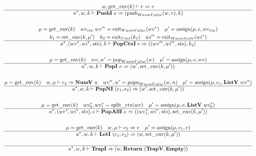 \begin{gather*}
  w, \getenv(k) \vdash e \Rightarrow v \\
  \hline
  \seq{a}, w, k \vdash \pushi ~ e \Rightarrow (\push_{WasmValue}(w, v), k) \\
%
\newline \\
  \mu = \getenv(k) \quad
  wv_{ctx} ~ \seq{wv'} = \exit_{WasmValue}(\seq{wv}) \quad
  \mu' = \assign(\mu, e, wv_{ctx}) \\
  k_1 = \setenv(k, \mu') \quad
  k_2 = \exit_{Cont}(k_1) \quad
  \seq{wi'} = \exit_{WasmInstr}(\seq{wi}) \\
  \hline
  \seq{a}, (\seq{wv}, \seq{wi}, sto), k \vdash \popctxi ~ e
  \Rightarrow
  ((\seq{wv'}, \seq{wi'}, sto), k_2) \\
%
\newline \\
  \mu = \getenv(k) \quad
  wv, w' = \pop_{WasmValue}(w) \quad
  \mu' = \assign(\mu, e, wv) \\
  \hline
  \seq{a}, w, k \vdash \popi ~ e \Rightarrow (w', \setenv(k, \mu')) \\
%
\newline \\
  \mu = \getenv(k) \quad
  w, \mu \vdash e_2 \Rightarrow \numv ~ n \quad
  wv^n, w' = \popn_{WasmValue}(w, n) \quad
  \mu' = \assign(\mu, e_1, \listv ~ wv^n) \\
  \hline
  \seq{a}, w, k \vdash \popni ~ (e_1, e_2) \Rightarrow (w', \setenv(k, \mu')) \\
%
\newline \\
  \mu = \getenv(k) \quad
  \seq{wv_0}, \seq{wv_1} = \splitctx(wv) \quad
  \mu' = \assign(\mu, e, \listv ~ \seq{wv_0}) \\
  \hline
  \seq{a}, (\seq{wv}, \seq{wi}, sto), e \vdash \popalli ~ e
  \Rightarrow
  ((\seq{wv_1}, \seq{wi}, sto), \setenv(k, \mu')) \\
%
\newline \\
  \mu = \getenv(k) \quad
  w, \mu \vdash e_2 \Rightarrow v \quad
  \mu' = \assign(\mu, e_1, v) \\
  \hline
  \seq{a}, w, k \vdash \leti ~ (e_1, e_2)
  \Rightarrow
  (w, \setenv(k, \mu')) \\
%
\newline \\
  \hline
  \seq{a}, w, k \vdash \trapi \Rightarrow (w, \ret ~ (\trapv, \mt)) \\

\end{gather*}
